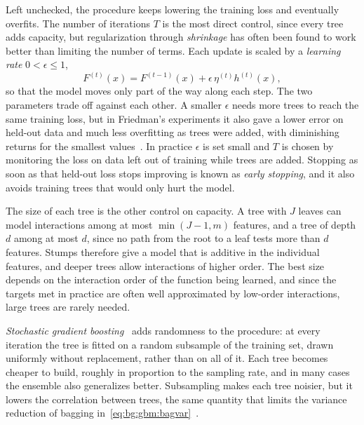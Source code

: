     Left unchecked, the procedure keeps lowering the training loss and
    eventually overfits. The number of iterations $T$ is the most direct control,
    since every tree adds capacity, but regularization through \emph{shrinkage}
    has often been found to work better than limiting the number of
    terms. Each update is scaled by a \emph{learning rate}
    $0 < \epsilon \le 1$,
    \begin{equation}
    F^{(t)}(x) = F^{(t-1)}(x) + \epsilon\, \eta^{(t)} h^{(t)}(x),
    \label{eq:bg:gbm:shrinkage}
    \end{equation}
    so that the model moves only part of the way along each step. The two
    parameters trade off against each other. A smaller $\epsilon$ needs more trees
    to reach the same training loss, but in Friedman's experiments it also gave a
    lower error on held-out data and much less overfitting as trees were added,
    with diminishing returns for the smallest values~\cite{friedman2001}. In
    practice $\epsilon$ is set small and $T$ is chosen by monitoring the loss on
    data left out of training while trees are added. Stopping
    as soon as that held-out loss stops improving is known as \emph{early
    stopping}, and it also avoids training trees that would only hurt the model.
    
    The size of each tree is the other control on capacity. A tree with $J$ leaves
    can model interactions among at most $\min(J - 1, m)$ features, and a tree of
    depth $d$ among at most $d$, since no path from the root to a leaf tests more
    than $d$ features. Stumps therefore give a model that is additive in the
    individual features, and deeper trees allow interactions of higher order. The
    best size depends on the interaction order of the function being learned, and
    since the targets met in practice are often well approximated by low-order
    interactions, large trees are rarely needed.
    
    \emph{Stochastic gradient boosting}~\cite{friedman2002} adds randomness to the
    procedure: at every iteration the tree is fitted on a random subsample of the
    training set, drawn uniformly without replacement, rather than on all of it.
    Each tree becomes cheaper to build, roughly in proportion to the sampling
    rate, and in many cases the ensemble also generalizes better. Subsampling makes
    each tree noisier, but it lowers the correlation between trees, the same
    quantity that limits the variance reduction of bagging
    in~\eqref{eq:bg:gbm:bagvar}~\cite{ibragimov2019}.


